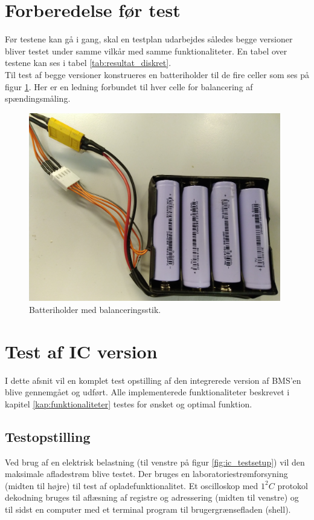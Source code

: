 \section{Forberedelse før test}\label{afs:tests}
Før testene kan gå i gang, skal en testplan udarbejdes således begge versioner bliver testet under samme vilkår med samme funktionaliteter. En tabel over testene kan ses i tabel \ref{tab:resultat_diskret}.
\\

Til test af begge versioner konstrueres en batteriholder til de fire celler som ses på figur \ref{fig:battery_holder}. Her er en ledning forbundet til hver celle for balancering af spændingsmåling.

\begin{figure}[h]
	\centering
	\includegraphics[width=11cm]{billeder/battery_holder.jpg}
	\caption{Batteriholder med balanceringsstik.}
	\label{fig:battery_holder}
\end{figure}

\section{Test af IC version}\label{afs:test_ic}
I dette afsnit vil en komplet test opstilling af den integrerede version af BMS'en blive gennemgået og udført. Alle implementerede funktionaliteter beskrevet i kapitel \ref{kap:funktionaliteter} testes for ønsket og optimal funktion. 

\subsection{Testopstilling}
Ved brug af en elektrisk belastning (til venstre på figur \ref{fig:ic_testsetup}) vil den maksimale afladestrøm blive testet. Der bruges en laboratoriestrømforsyning (midten til højre) til test af opladefunktionalitet. Et oscilloskop med $1^2C$ protokol dekodning bruges til aflæsning af registre og adressering (midten til venstre) og til sidst en computer med et terminal program til brugergrænsefladen (shell). 

